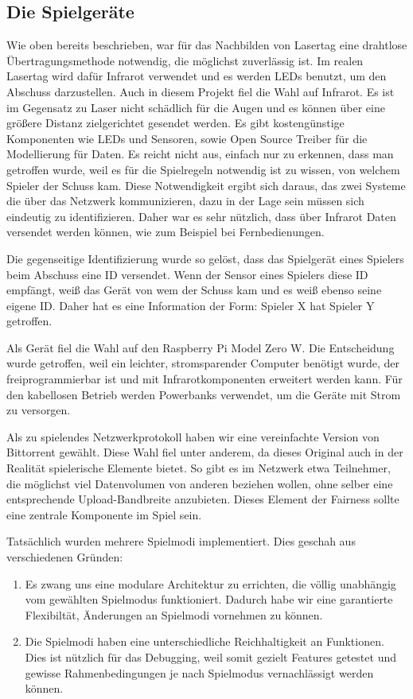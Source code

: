 \subsection{Die Spielgeräte}

Wie oben bereits beschrieben, war für das Nachbilden von Lasertag eine drahtlose Übertragungsmethode
notwendig, die möglichst zuverlässig ist.
Im realen Lasertag wird dafür Infrarot verwendet und es werden LEDs benutzt, um den Abschuss
darzustellen.
Auch in diesem Projekt fiel die Wahl auf Infrarot.
Es ist im Gegensatz zu Laser nicht schädlich für die Augen und es können über eine größere Distanz
zielgerichtet gesendet werden.
Es gibt kostengünstige Komponenten wie LEDs und Sensoren, sowie Open Source Treiber für die
Modellierung für Daten.
Es reicht nicht aus, einfach nur zu erkennen, dass man getroffen wurde, weil es für die Spielregeln
notwendig ist zu wissen, von welchem Spieler der Schuss kam.
Diese Notwendigkeit ergibt sich daraus, das zwei Systeme die über das Netzwerk kommunizieren, dazu
in der Lage sein müssen sich eindeutig zu identifizieren.
Daher war es sehr nützlich, dass über Infrarot Daten versendet werden können, wie zum Beispiel bei
Fernbedienungen.

Die gegenseitige Identifizierung wurde so gelöst, dass das Spielgerät eines Spielers beim Abschuss
eine ID versendet.
Wenn der Sensor eines Spielers diese ID empfängt, weiß das Gerät von wem der Schuss kam und es weiß
ebenso seine eigene ID.
Daher hat es eine Information der Form: Spieler X hat Spieler Y getroffen.

Als Gerät fiel die Wahl auf den Raspberry Pi Model Zero W. Die Entscheidung wurde getroffen, weil
ein leichter, stromsparender Computer benötigt wurde, der freiprogrammierbar ist und mit
Infrarotkomponenten erweitert werden kann.
Für den kabellosen Betrieb werden Powerbanks verwendet, um die Geräte mit Strom zu versorgen.

Als zu spielendes Netzwerkprotokoll haben wir eine vereinfachte Version von Bittorrent gewählt.
Diese Wahl fiel unter anderem, da dieses Original auch in der Realität spielerische Elemente bietet.
So gibt es im Netzwerk etwa Teilnehmer, die möglichst viel Datenvolumen von anderen beziehen wollen,
ohne selber eine entsprechende Upload-Bandbreite anzubieten.
Dieses Element der Fairness sollte eine zentrale Komponente im Spiel sein.

Tatsächlich wurden mehrere Spielmodi implementiert.
Dies geschah aus verschiedenen Gründen:
\begin{enumerate}
  \item
    Es zwang uns eine modulare Architektur zu errichten, die völlig unabhängig vom gewählten
    Spielmodus funktioniert.
    Dadurch habe wir eine garantierte Flexibiltät, Änderungen an Spielmodi vornehmen zu können.
  \item
    Die Spielmodi haben eine unterschiedliche Reichhaltigkeit an Funktionen.
    Dies ist nützlich für das Debugging, weil somit gezielt Features getestet und gewisse
    Rahmenbedingungen je nach Spielmodus vernachlässigt werden können.
\end{enumerate}
